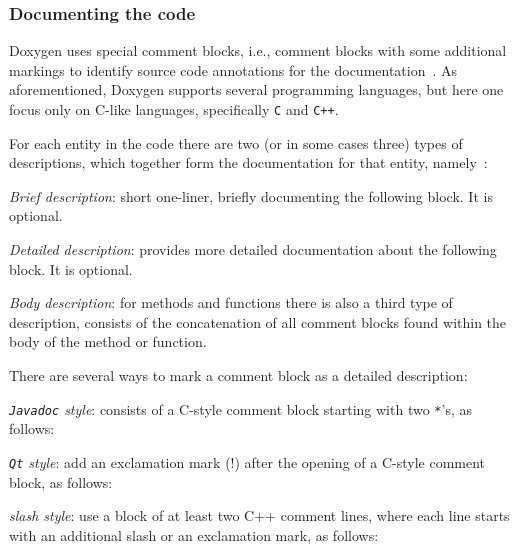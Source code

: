 \subsubsection{Documenting the code}
\label{sec:documenting-code}
Doxygen uses special comment blocks, i.e., comment blocks with some
additional markings to identify source code annotations for the
documentation~\cite{doxygenDocBlocks}. As aforementioned, Doxygen supports several programming
languages, but here one focus only on C-like languages, specifically \texttt{C}
and \texttt{C++}.

For each entity in the code there are two (or in some cases three) types of descriptions, which together form
the documentation for that entity, namely~\cite{doxygenDocBlocks}:
\begin{enum-c}
\item \emph{Brief description}: short one-liner, briefly documenting the
  following block. It is optional.
\item \emph{Detailed description}: provides more detailed documentation about
  the following block. It is optional.
\item \emph{Body description}:
for methods and functions there is also a third type of description, consists of
the concatenation of all comment blocks found within the body of the method or
function.
\end{enum-c}

There are several ways to mark a comment block as a detailed description:
\begin{enum-c}
\item \emph{\texttt{Javadoc} style}: 
  consists of a C-style comment block starting with two \texttt{*}'s, as follows:

\item \emph{\texttt{Qt} style}: add an exclamation mark (!) after the opening of
  a C-style comment block, as follows:

\item \emph{slash style}: use a block of at least two C++ comment lines, where
  each line starts with an additional slash or an exclamation mark, as follows:

\vspace{-.8em}
  
\end{enum-c}


